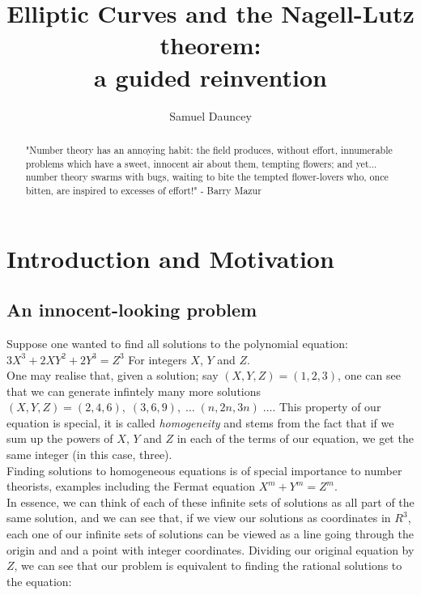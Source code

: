 \documentclass{article}
\title{Elliptic Curves and the Nagell-Lutz theorem:\\a guided reinvention}
\author{Samuel Dauncey}
\begin{document}
\maketitle

\begin{abstract}
    
"Number theory has an annoying habit: the field produces, without effort, innumerable problems which have a sweet, innocent air about them, tempting flowers; and yet... number theory swarms with bugs, waiting to bite the tempted flower-lovers who, once bitten, are inspired to excesses of effort!" - Barry Mazur
\end{abstract}

\section{Introduction and Motivation}

\subsection{An innocent-looking problem}

Suppose one wanted to find all solutions to the polynomial equation:\\

$3 X^3 +  2 X Y^2 + 2 Y^3 = Z^3$ \quad For integers $X$, $Y$ and $Z$. \\

 One may realise that, given a solution; say $(X, Y, Z) = (1, 2, 3)$, one can see that we can generate infintely many more solutions $(X, Y, Z) = (2, 4, 6), \; (3, 6, 9), \; \dots \; (n, 2n, 3n) \; \dots $. This property of our equation is special, it is called \emph{homogeneity} and stems from the fact that if we sum up the powers of $X$, $Y$ and $Z$ in each of the terms of our equation, we get the same integer (in this case, three). \\
 
 Finding solutions to homogeneous equations is of special importance to number theorists, examples including the Fermat equation $X^m + Y^m = Z^m$. \\
 
 In essence, we can think of each of these infinite sets of solutions as all part of the same solution, and we can see that, if we view our solutions as coordinates in $R^3$, each one of our infinite sets of solutions can be viewed as a line going through the origin and and a point with integer coordinates. Dividing our original equation by $Z$, we can see that our problem is equivalent to finding the rational solutions to the equation:\\
 
\end{document}
